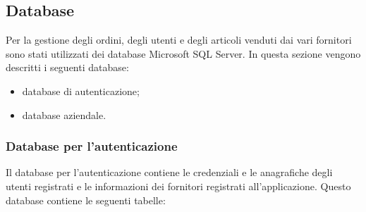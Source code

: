 \documentclass[12pt, a4paper, titlepage]{report}
\begin{document}
	\subsection{Database}
	Per la gestione degli ordini, degli utenti e degli articoli venduti dai vari fornitori sono stati utilizzati dei database Microsoft SQL Server. In questa sezione vengono descritti i seguenti database:
	\begin{itemize}
		\item database di autenticazione;
		\item database aziendale.
	\end{itemize}
	
	\subsubsection{Database per l'autenticazione}
	Il database per l'autenticazione contiene le credenziali e le anagrafiche degli utenti registrati e le informazioni dei fornitori registrati all'applicazione. Questo database contiene le seguenti tabelle:
\end{document}
